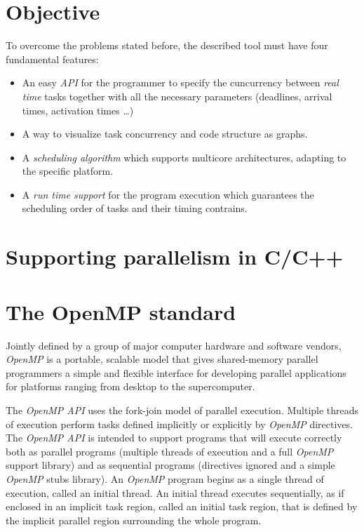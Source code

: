 \documentclass[a4paper,11pt,oneside]{book}
\begin{document}
\section{Objective}

To overcome the problems stated before, the described tool must have four fundamental features:
\begin{itemize}
\item{An easy \emph{API} for the programmer to specify the cuncurrency between \emph{real time} tasks together with all the necessary parameters (deadlines, arrival times, activation times \dots)}
\item{A way to visualize task concurrency and code structure as graphs.}
\item{A \emph{scheduling algorithm} which supports multicore architectures, adapting to the specific platform.}
\item{A \emph{run time support} for the program execution which guarantees the scheduling order of tasks and their timing contrains.}
\end{itemize}


\section{Supporting parallelism in C/C++}
\section{The OpenMP standard}

Jointly defined by a group of major computer hardware and software vendors, \emph{OpenMP} is a portable, scalable model that gives shared-memory parallel programmers a simple and flexible interface for developing parallel applications for platforms ranging from desktop to the supercomputer.

The \emph{OpenMP API} uses the fork-join model of parallel execution. Multiple threads of execution perform tasks defined implicitly or explicitly by \emph{OpenMP} directives. The \emph{OpenMP API} is intended to support programs that will execute correctly both as parallel programs (multiple threads of execution and a full \emph{OpenMP} support library) and as sequential programs (directives ignored and a simple \emph{OpenMP} stubs library).
An \emph{OpenMP} program begins as a single thread of execution, called an initial thread. An initial thread executes sequentially, as if enclosed in an implicit task region, called an initial task region, that is defined by the implicit parallel region surrounding the whole program.
\end{document}
